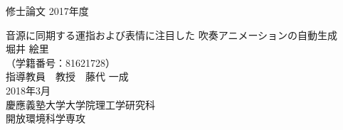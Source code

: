 {\LARGE 修士論文} \hspace{\fill} {\LARGE 2017年度}
\vspace{3cm}
\begin{center}
{\LARGE 音源に同期する運指および表情に注目した	吹奏アニメーションの自動生成}
\\
\vspace{2cm}
{\Huge 堀井 絵里} \\ \vspace{1.5ex}
{\LARGE （学籍番号：81621728）} \\
\vspace{6.5cm}
{\LARGE 指導教員　教授　藤代 一成} \\
\vspace{2.5cm}
{\Large 2018年3月} \\
\vspace{0.8cm}
{\LARGE 慶應義塾大学大学院理工学研究科} \\ \vspace{1.5ex}
{\LARGE 開放環境科学専攻} \\
\end{center}
